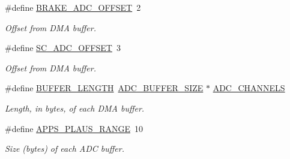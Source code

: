\begin{DoxyCompactItemize}
\mbox{\label{group___board__model__group_gade98eccd60c9b68cde78ca4c0009a84c}} 
\#define \mbox{\hyperlink{group___board__model__group_gade98eccd60c9b68cde78ca4c0009a84c}{B\+R\+A\+K\+E\+\_\+\+A\+D\+C\+\_\+\+O\+F\+F\+S\+ET}}~2
\begin{DoxyCompactList}\small\item\em Offset from D\+MA buffer. \end{DoxyCompactList}\item 
\mbox{\label{group___board__model__group_ga58133efa918e1af6c0cc436137c78cc0}} 
\#define \mbox{\hyperlink{group___board__model__group_ga58133efa918e1af6c0cc436137c78cc0}{S\+C\+\_\+\+A\+D\+C\+\_\+\+O\+F\+F\+S\+ET}}~3
\begin{DoxyCompactList}\small\item\em Offset from D\+MA buffer. \end{DoxyCompactList}\item 
\mbox{\label{group___board__model__group_gaf7b7dc9a200cb1404c280bd500fd1551}} 
\#define \mbox{\hyperlink{group___board__model__group_gaf7b7dc9a200cb1404c280bd500fd1551}{B\+U\+F\+F\+E\+R\+\_\+\+L\+E\+N\+G\+TH}}~\mbox{\hyperlink{group___board__model__group_ga602abb8ec84dcb3b6f854a738310ea46}{A\+D\+C\+\_\+\+B\+U\+F\+F\+E\+R\+\_\+\+S\+I\+ZE}} $\ast$ \mbox{\hyperlink{group___board__model__group_ga065dcfa648ca52ed6214008cb177de36}{A\+D\+C\+\_\+\+C\+H\+A\+N\+N\+E\+LS}}
\begin{DoxyCompactList}\small\item\em Length, in bytes, of each D\+MA buffer. \end{DoxyCompactList}\item 
\mbox{\label{group___board__model__group_ga3e1022cd2e2154437b583f7ff83f2960}} 
\#define \mbox{\hyperlink{group___board__model__group_ga3e1022cd2e2154437b583f7ff83f2960}{A\+P\+P\+S\+\_\+\+P\+L\+A\+U\+S\+\_\+\+R\+A\+N\+GE}}~10
\begin{DoxyCompactList}\small\item\em Size (bytes) of each A\+DC buffer. \end{DoxyCompactList}\item 
\mbox{\label{group___board__model__group_ga6741cba3daf129b6f73eed1b1db09519}} 

\end{DoxyCompactItemize}
